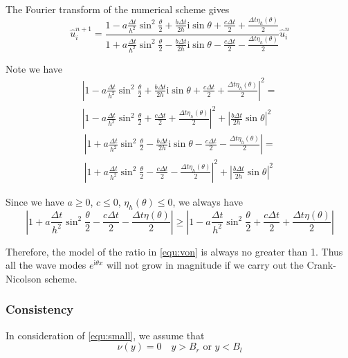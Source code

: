 \documentclass[10pt,a4paper]{article}
\newcommand{\ii}[0]{\mathrm{i}}
\theoremstyle{definition}
\begin{document}
The Fourier transform of the numerical scheme gives
\begin{equation}\label{equ:von}
	\hat u_i^{n+1} = \frac{{1 - a\frac{{\Delta t}}{{{h^2}}}{{\sin }^2}\frac{\theta }{2} + \frac{{b\Delta t}}{{2h}}\ii\sin \theta  + \frac{{c\Delta t}}{2}+ \frac{{\Delta t\eta_h (\theta )}}{2}}}{{1 + a\frac{{\Delta t}}{{{h^2}}}{{\sin }^2}\frac{\theta }{2} - \frac{{b\Delta t}}{{2h}}\ii\sin \theta  - \frac{{c\Delta t}}{2} - \frac{{\Delta t\eta_h (\theta )}}{2}}} \hat u_i^n
\end{equation}

Note we have
\begin{multline}
{\left| {1 - a\frac{{\Delta t}}{{{h^2}}}{{\sin }^2}\frac{\theta }{2} + \frac{{b\Delta t}}{{2h}}\ii\sin \theta  + \frac{{c\Delta t}}{2} + \frac{{\Delta t\eta_h (\theta )}}{2}} \right|^2} = \\
{\left| {1 - a\frac{{\Delta t}}{{{h^2}}}{{\sin }^2}\frac{\theta }{2} + \frac{{c\Delta t}}{2} + \frac{{\Delta t\eta_h (\theta )}}{2}} \right|^2} + {\left| {\frac{{b\Delta t}}{{2h}}\sin \theta } \right|^2}
\end{multline}
\begin{multline}
\left| {1 + a\frac{{\Delta t}}{{{h^2}}}{{\sin }^2}\frac{\theta }{2} - \frac{{b\Delta t}}{{2h}}\ii\sin \theta  - \frac{{c\Delta t}}{2} - \frac{{\Delta t\eta_h (\theta )}}{2}} \right| = \\
{\left| {1 + a\frac{{\Delta t}}{{{h^2}}}{{\sin }^2}\frac{\theta }{2} - \frac{{c\Delta t}}{2} - \frac{{\Delta t\eta_h (\theta )}}{2}} \right|^2} + {\left| {\frac{{b\Delta t}}{{2h}}\sin \theta } \right|^2}
\end{multline}

Since we have $a\geq 0$, $c\leq 0$, $\eta_h(\theta)\leq  0$, we always have
\begin{equation}
	\left| {1 + a\frac{{\Delta t}}{{{h^2}}}{{\sin }^2}\frac{\theta }{2} - \frac{{c\Delta t}}{2} - \frac{{\Delta t\eta (\theta )}}{2}} \right| \ge \left| {1 - a\frac{{\Delta t}}{{{h^2}}}{{\sin }^2}\frac{\theta }{2} + \frac{{c\Delta t}}{2} + \frac{{\Delta t\eta (\theta )}}{2}} \right|
\end{equation}

Therefore, the model of the ratio in \cref{equ:von} is always no greater than 1. Thus all the wave modes $e^{\ii \theta x}$ will not grow in magnitude if we carry out the Crank-Nicolson scheme. 

\subsubsection{Consistency}
In consideration of \cref{equ:small}, we assume that 
\begin{equation}\label{equ:assumption}
	\nu(y) = 0 \quad y>B_r \mbox{ or } y<B_l
\end{equation}
\end{document}
